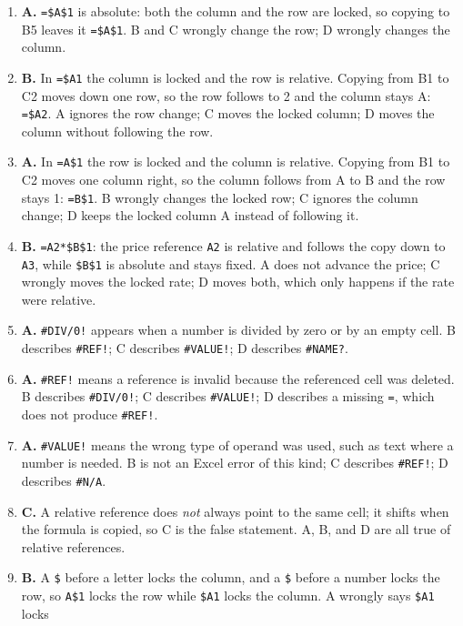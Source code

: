 \documentclass[11pt]{article}
\begin{document}
\begin{enumerate}[label=\textbf{Q\arabic*.}, leftmargin=*]
  result of copying a relative reference.
\item \textbf{A.} \texttt{=\$A\$1} is absolute: both the column and the row
  are locked, so copying to B5 leaves it \texttt{=\$A\$1}. B and C wrongly
  change the row; D wrongly changes the column.
\item \textbf{B.} In \texttt{=\$A1} the column is locked and the row is
  relative. Copying from B1 to C2 moves down one row, so the row follows to 2
  and the column stays A: \texttt{=\$A2}. A ignores the row change; C moves
  the locked column; D moves the column without following the row.
\item \textbf{A.} In \texttt{=A\$1} the row is locked and the column is
  relative. Copying from B1 to C2 moves one column right, so the column
  follows from A to B and the row stays 1: \texttt{=B\$1}. B wrongly changes
  the locked row; C ignores the column change; D keeps the locked column A
  instead of following it.
\item \textbf{B.} \texttt{=A2*\$B\$1}: the price reference \texttt{A2} is
  relative and follows the copy down to \texttt{A3}, while \texttt{\$B\$1} is
  absolute and stays fixed. A does not advance the price; C wrongly moves the
  locked rate; D moves both, which only happens if the rate were relative.
\item \textbf{A.} \texttt{\#DIV/0!} appears when a number is divided by zero
  or by an empty cell. B describes \texttt{\#REF!}; C describes
  \texttt{\#VALUE!}; D describes \texttt{\#NAME?}.
\item \textbf{A.} \texttt{\#REF!} means a reference is invalid because the
  referenced cell was deleted. B describes \texttt{\#DIV/0!}; C describes
  \texttt{\#VALUE!}; D describes a missing \texttt{=}, which does not produce
  \texttt{\#REF!}.
\item \textbf{A.} \texttt{\#VALUE!} means the wrong type of operand was used,
  such as text where a number is needed. B is not an Excel error of this kind;
  C describes \texttt{\#REF!}; D describes \texttt{\#N/A}.
\item \textbf{C.} A relative reference does \emph{not} always point to the
  same cell; it shifts when the formula is copied, so C is the false
  statement. A, B, and D are all true of relative references.
\item \textbf{B.} A \texttt{\$} before a letter locks the column, and a
  \texttt{\$} before a number locks the row, so \texttt{A\$1} locks the row
  while \texttt{\$A1} locks the column. A wrongly says \texttt{\$A1} locks

\end{enumerate}
\end{document}
